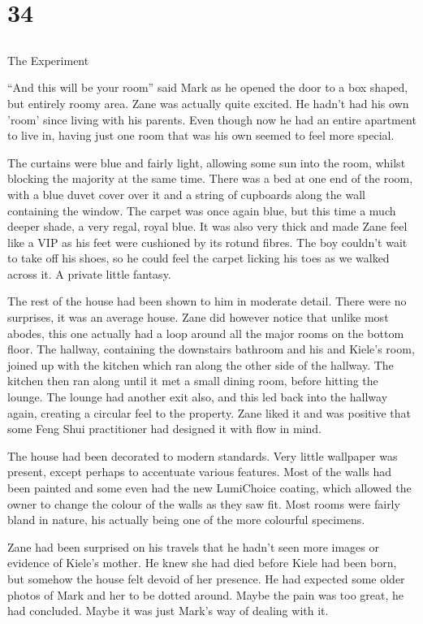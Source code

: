 \chapter{34}
\section{}
The Experiment  

``And this will be your room'' said Mark as he opened the door to a box shaped, but entirely roomy area.  Zane was actually quite excited.  He hadn't had his own 'room' since living with his parents.  Even though now he had an entire apartment to live in, having just one room that was his own seemed to feel more special.  

The curtains were blue and fairly light, allowing some sun into the room, whilst blocking the majority at the same time.  There was a bed at one end of the room, with a blue duvet cover over it and a string of cupboards along the wall containing the window.  The carpet was once again blue, but this time a much deeper shade, a very regal, royal blue.  It was also very thick and made Zane feel like a VIP as his feet were cushioned by its rotund fibres.  The boy couldn't wait to take off his shoes, so he could feel the carpet licking his toes as we walked across it.  A private little fantasy.

The rest of the house had been shown to him in moderate detail.  There were no surprises, it was an average house.  Zane did however notice that unlike most abodes, this one actually had a loop around all the major rooms on the bottom floor.  The hallway, containing the downstairs bathroom and his and Kiele's room, joined up with the kitchen which ran along the other side of the hallway.  The kitchen then ran along until it met a small dining room, before hitting the lounge.  The lounge had another exit also, and this led back into the hallway again, creating a circular feel to the property.  Zane liked it and was positive that some Feng Shui practitioner had designed it with flow in mind.

The house had been decorated to modern standards.  Very little wallpaper was present, except perhaps to accentuate various features.  Most of the walls had been painted and some even had the new LumiChoice coating, which allowed the owner to change the colour of the walls as they saw fit.  Most rooms were fairly bland in nature, his actually being one of the more colourful specimens.  

Zane had been surprised on his travels that he hadn't seen more images or evidence of Kiele's mother.  He knew she had died before Kiele had been born, but somehow the house felt devoid of her presence.  He had expected some older photos of Mark and her to be dotted around.  Maybe the pain was too great, he had concluded.  Maybe it was just Mark's way of dealing with it.

